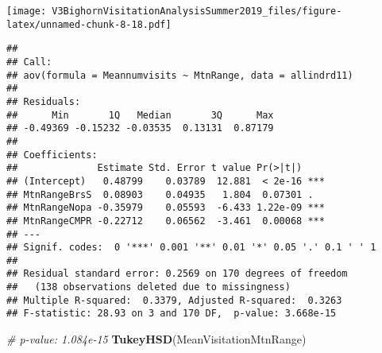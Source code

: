 \documentclass[]{article}
\newenvironment{Shaded}{\begin{snugshade}}{\end{snugshade}}
\newcommand{\CommentTok}[1]{\textcolor[rgb]{0.56,0.35,0.01}{\textit{#1}}}
\newcommand{\DataTypeTok}[1]{\textcolor[rgb]{0.13,0.29,0.53}{#1}}
\newcommand{\KeywordTok}[1]{\textcolor[rgb]{0.13,0.29,0.53}{\textbf{#1}}}
\newcommand{\NormalTok}[1]{#1}
\newcommand{\OperatorTok}[1]{\textcolor[rgb]{0.81,0.36,0.00}{\textbf{#1}}}
\newcommand{\StringTok}[1]{\textcolor[rgb]{0.31,0.60,0.02}{#1}}
\begin{document}
\texttt{[image: V3BighornVisitationAnalysisSummer2019\_files/figure-latex/unnamed-chunk-8-18.pdf]}

\begin{Shaded}
\end{Shaded}

\begin{verbatim}
## 
## Call:
## aov(formula = Meannumvisits ~ MtnRange, data = allindrd11)
## 
## Residuals:
##      Min       1Q   Median       3Q      Max 
## -0.49369 -0.15232 -0.03535  0.13131  0.87179 
## 
## Coefficients:
##              Estimate Std. Error t value Pr(>|t|)    
## (Intercept)   0.48799    0.03789  12.881  < 2e-16 ***
## MtnRangeBrsS  0.08903    0.04935   1.804  0.07301 .  
## MtnRangeNopa -0.35979    0.05593  -6.433 1.22e-09 ***
## MtnRangeCMPR -0.22712    0.06562  -3.461  0.00068 ***
## ---
## Signif. codes:  0 '***' 0.001 '**' 0.01 '*' 0.05 '.' 0.1 ' ' 1
## 
## Residual standard error: 0.2569 on 170 degrees of freedom
##   (138 observations deleted due to missingness)
## Multiple R-squared:  0.3379, Adjusted R-squared:  0.3263 
## F-statistic: 28.93 on 3 and 170 DF,  p-value: 3.668e-15
\end{verbatim}

\begin{Shaded}
\begin{Highlighting}[]
\CommentTok{# p-value: 1.084e-15}
\KeywordTok{TukeyHSD}\NormalTok{(MeanVisitationMtnRange)}
\end{Highlighting}
\end{Shaded}
\end{document}
